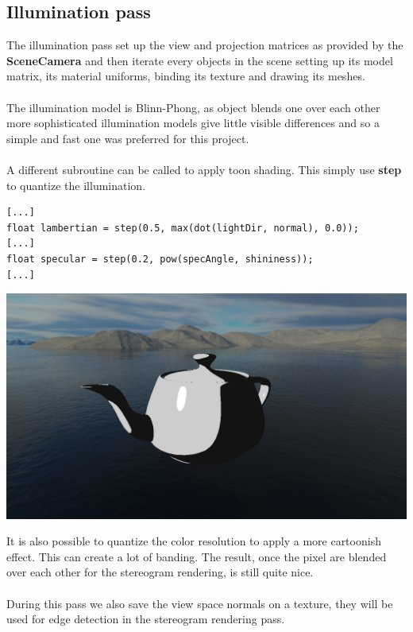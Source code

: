 \documentclass[12pt, a4paper]{article}
\begin{document}
\subsection{Illumination pass}
The illumination pass set up the view and projection matrices as provided by the \textbf{SceneCamera} and then iterate
every objects in the scene setting up its model matrix, its material uniforms, binding its texture and drawing its meshes.\\\\
The illumination model is Blinn-Phong, as object blends one over each other more sophisticated illumination models give little
visible differences and so a simple and fast one was preferred for this project.\\\\
A different subroutine can be called to apply toon shading. This simply use \textbf{step} to quantize the illumination.
\begin{lstlisting}[caption={Toon shading subroutine version},captionpos=b]
[...]
float lambertian = step(0.5, max(dot(lightDir, normal), 0.0));
[...]
float specular = step(0.2, pow(specAngle, shininess));
[...]
\end{lstlisting}
\begin{center}
    \centering
    \includegraphics[width=1.0\textwidth]{img/toon.png}
\end{center}
It is also possible to quantize the color resolution to apply a more cartoonish effect. This can create a lot
of banding. The result, once the pixel are blended over each other for the stereogram rendering, is still quite nice.\\\\
During this pass we also save the view space normals on a texture, they will be used for edge detection in the stereogram
rendering pass.
\end{document}
